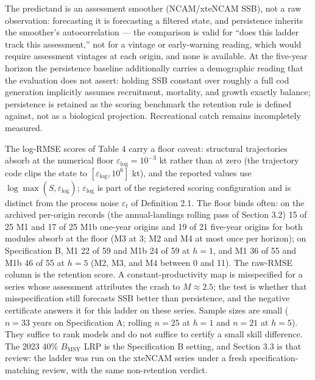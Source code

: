 \documentclass[11pt]{article}
\begin{document}
The predictand is an assessment smoother (NCAM/xteNCAM SSB), not a raw
observation: forecasting it is forecasting a filtered state, and
persistence inherits the smoother's autocorrelation --- the comparison
is valid for ``does this ladder track this assessment,'' not for a
vintage or early-warning reading, which would require assessment
vintages at each origin, and none is available. At the five-year horizon
the persistence baseline additionally carries a demographic reading that
the evaluation does not assert: holding SSB constant over roughly a full
cod generation implicitly assumes recruitment, mortality, and growth
exactly balance; persistence is retained as the scoring benchmark the
retention rule is defined against, not as a biological projection.
Recreational catch remains incompletely measured.

The log-RMSE scores of Table 4 carry a floor caveat: structural
trajectories absorb at the numerical floor
\(\varepsilon_{\mathrm{log}} = 10^{-3}\) kt rather than at zero (the
trajectory code clips the state to
\([\varepsilon_{\mathrm{log}}, 10^{6}]\) kt), and the reported values
use \(\log\max(\hat S, \varepsilon_{\mathrm{log}})\);
\(\varepsilon_{\mathrm{log}}\) is part of the registered scoring
configuration and is distinct from the process noise \(\varepsilon_t\)
of Definition 2.1. The floor binds often: on the archived per-origin
records (the annual-landings rolling pass of Section 3.2) 15 of 25 M1
and 17 of 25 M1b one-year origins and 19 of 21 five-year origins for
both modules absorb at the floor (M3 at 3; M2 and M4 at most once per
horizon); on Specification B, M1 22 of 59 and M1b 24 of 59 at \(h=1\),
and M1 36 of 55 and M1b 46 of 55 at \(h=5\) (M2, M3, and M4 between 0
and 11). The
raw-RMSE column is the retention score. A constant-productivity map is
misspecified for a series whose assessment attributes the crash to
\(M \approx 2.5\); the test is whether that misspecification still
forecasts SSB better than persistence, and the negative certificate
answers it for this ladder on these series. Sample sizes are small
(\(n=33\) years on Specification A; rolling \(n=25\) at \(h=1\) and
\(n=21\) at \(h=5\)). They suffice to rank models and do not suffice to
certify a small skill difference. The 2023 40\% \(B_{\mathrm{MSY}}\) LRP
is the Specification B setting, and Section 3.3 is that review: the
ladder was run on the xteNCAM series under a fresh
specification-matching review, with the same non-retention verdict.
\end{document}
